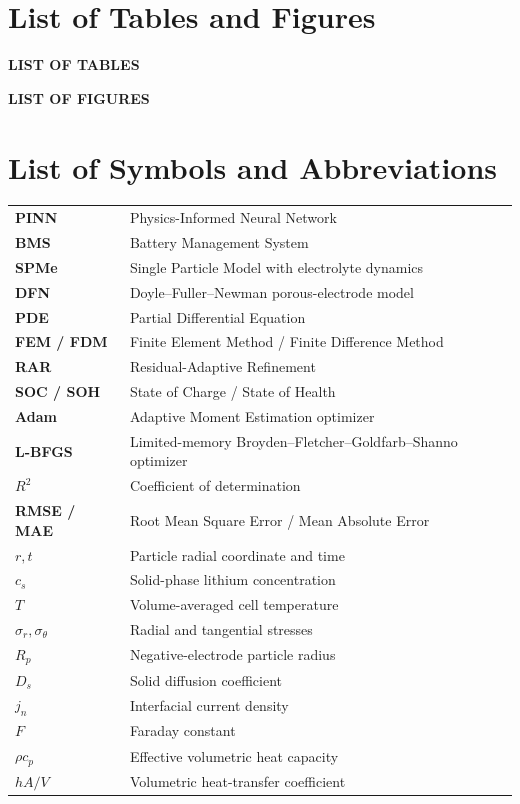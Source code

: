 \documentclass[14pt,a4paper,oneside]{extreport}
\renewcommand{\arraystretch}{1.25}
\begin{document}
\clearpage
\chapter*{List of Tables and Figures}
\label{pre:lists}
\begingroup
\small
{}
{\centering\bfseries LIST OF TABLES\par}
\makeatletter{}\makeatother
\vspace{0.35cm}
{\centering\bfseries LIST OF FIGURES\par}
\makeatletter{}\makeatother
\endgroup
\clearpage

\chapter*{List of Symbols and Abbreviations}
\label{pre:symbols}
\begingroup
{}
\renewcommand{\arraystretch}{1.0}
\begin{longtable}{>{\bfseries}p{}p{}}
PINN & Physics-Informed Neural Network\\
BMS & Battery Management System\\
SPMe & Single Particle Model with electrolyte dynamics\\
DFN & Doyle--Fuller--Newman porous-electrode model\\
PDE & Partial Differential Equation\\
FEM / FDM & Finite Element Method / Finite Difference Method\\
RAR & Residual-Adaptive Refinement\\
SOC / SOH & State of Charge / State of Health\\
Adam & Adaptive Moment Estimation optimizer\\
L-BFGS & Limited-memory Broyden--Fletcher--Goldfarb--Shanno optimizer\\
$R^2$ & Coefficient of determination\\
RMSE / MAE & Root Mean Square Error / Mean Absolute Error\\
$r,t$ & Particle radial coordinate and time\\
$c_s$ & Solid-phase lithium concentration\\
$T$ & Volume-averaged cell temperature\\
$\sigma_r,\sigma_{\theta}$ & Radial and tangential stresses\\
$R_p$ & Negative-electrode particle radius\\
$D_s$ & Solid diffusion coefficient\\
$j_n$ & Interfacial current density\\
$F$ & Faraday constant\\
$\rho c_p$ & Effective volumetric heat capacity\\
$hA/V$ & Volumetric heat-transfer coefficient\\
\end{longtable}
\endgroup
\end{document}
